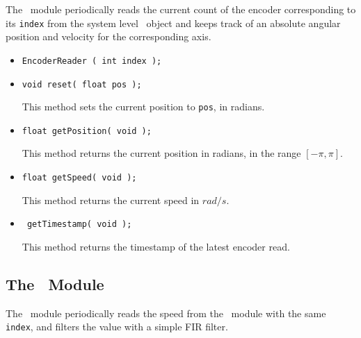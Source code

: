 \begin{moduleheader}
\classname{\EncoderReader} \mline
\modulebase{\Module} \mline
{} \mline
{}
\end{moduleheader}

The \EncoderReader\ module periodically reads the current count of the
encoder corresponding to its {\tt index} from the system level \Hardware\
object and keeps track of an absolute angular position and velocity for the
corresponding axis. \\

\constructors

\begin{itemize}
\item{\tt EncoderReader ( int index ); }
\end{itemize}

\localinterface

\begin{itemize}
\item{\tt void reset( float pos );}\par
This method sets the current position to {\tt pos}, in radians.
\item{\tt float getPosition( void );} \par 
This method returns the current position in radians, in the range $[-\pi,
\pi]$.
\item{\tt float getSpeed( void );} \par
This method returns the current speed in $rad/s$.
\item{\tt \CLOCK\ getTimestamp( void );} \par
This method returns the timestamp of the latest encoder read.
\end{itemize}

\subsection{The \SpeedFilter\ Module}

\begin{moduleheader}
\classname{\SpeedFilter} \mline
\modulebase{\Module} \mline
{} \mline
{}
\usedmodules{\EncoderReader}
\end{moduleheader}

The \SpeedFilter\ module periodically reads the speed from the
\EncoderReader\ module with the same {\tt index}, and filters the value with
a simple FIR filter. \\


